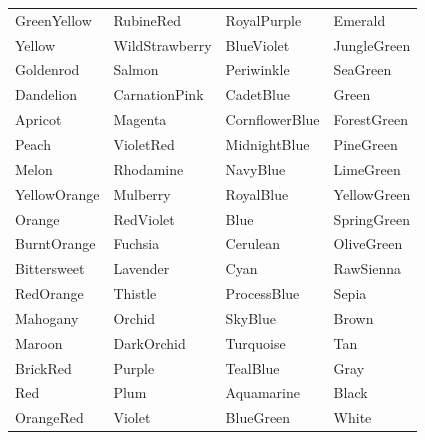 \documentclass{article}
\newcommand\myfcolorbox[1]{\fcolorbox{black}{#1}{\phantom{\tiny{color}}} #1\quad}
\begin{document}
	\begin{center}
		\begin{tabular}{llll}
			\myfcolorbox{GreenYellow} & \myfcolorbox{RubineRed} & \myfcolorbox{RoyalPurple} & \myfcolorbox{Emerald} \\ 
			\myfcolorbox{Yellow} & \myfcolorbox{WildStrawberry} & \myfcolorbox{BlueViolet} & \myfcolorbox{JungleGreen} \\ 
			\myfcolorbox{Goldenrod} & \myfcolorbox{Salmon} & \myfcolorbox{Periwinkle} & \myfcolorbox{SeaGreen} \\ 
			\myfcolorbox{Dandelion} & \myfcolorbox{CarnationPink} & \myfcolorbox{CadetBlue} & \myfcolorbox{Green} \\ 
			\myfcolorbox{Apricot} & \myfcolorbox{Magenta} & \myfcolorbox{CornflowerBlue} & \myfcolorbox{ForestGreen} \\ 
			\myfcolorbox{Peach} & \myfcolorbox{VioletRed} & \myfcolorbox{MidnightBlue} & \myfcolorbox{PineGreen} \\ 
			\myfcolorbox{Melon} & \myfcolorbox{Rhodamine} & \myfcolorbox{NavyBlue} & \myfcolorbox{LimeGreen} \\
			\myfcolorbox{YellowOrange} & \myfcolorbox{Mulberry} & \myfcolorbox{RoyalBlue} & \myfcolorbox{YellowGreen} \\
			\myfcolorbox{Orange} & \myfcolorbox{RedViolet} & \myfcolorbox{Blue} & \myfcolorbox{SpringGreen} \\
			\myfcolorbox{BurntOrange} & \myfcolorbox{Fuchsia} & \myfcolorbox{Cerulean} & \myfcolorbox{OliveGreen} \\
			\myfcolorbox{Bittersweet} & \myfcolorbox{Lavender} & \myfcolorbox{Cyan} & \myfcolorbox{RawSienna} \\
			\myfcolorbox{RedOrange} & \myfcolorbox{Thistle} & \myfcolorbox{ProcessBlue} & \myfcolorbox{Sepia} \\
			\myfcolorbox{Mahogany} & \myfcolorbox{Orchid} & \myfcolorbox{SkyBlue} & \myfcolorbox{Brown} \\
			\myfcolorbox{Maroon} & \myfcolorbox{DarkOrchid} & \myfcolorbox{Turquoise} & \myfcolorbox{Tan} \\
			\myfcolorbox{BrickRed} & \myfcolorbox{Purple} & \myfcolorbox{TealBlue} & \myfcolorbox{Gray} \\
			\myfcolorbox{Red} & \myfcolorbox{Plum} & \myfcolorbox{Aquamarine} & \myfcolorbox{Black} \\
			\myfcolorbox{OrangeRed} & \myfcolorbox{Violet} & \myfcolorbox{BlueGreen} & \myfcolorbox{White} \\
		\end{tabular}
	\end{center}
\end{document}
